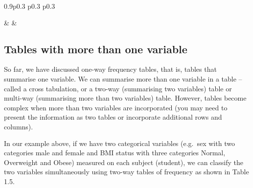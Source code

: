 \documentclass[
]{memoir}
\begin{document}
\begin{table}[ht]
\begin{centerbox}
\begin{threeparttable}
\begin{tabularx}{0.9\textwidth}{p{} p{} p{}}
\hhline{}

 &
 &
 \tabularnewline[-0.5pt]


\end{tabularx}
\end{threeparttable}\par\end{centerbox}

\end{table}
 

\hypertarget{tables-with-more-than-one-variable}{%
\subsection{Tables with more than one variable}\label{tables-with-more-than-one-variable}}

So far, we have discussed one-way frequency tables, that is, tables that summarise one variable. We can summarise more than one variable in a table -- called a cross tabulation, or a two-way (summarising two variables) table or multi-way (summarising more than two variables) table. However, tables become complex when more than two variables are incorporated (you may need to present the information as two tables or incorporate additional rows and columns).

In our example above, if we have two categorical variables (e.g.~sex with two categories male and female and BMI status with three categories Normal, Overweight and Obese) measured on each subject (student), we can classify the two variables simultaneously using two-way tables of frequency as shown in Table 1.5.

 
  \providecommand{\huxb}[2]{\arrayrulecolor[RGB]{#1}\global\arrayrulewidth=#2pt}
  \providecommand{\huxvb}[2]{\color[RGB]{#1}\vrule width #2pt}
  \providecommand{\huxtpad}[1]{\rule{0pt}{#1}}
  \providecommand{\huxbpad}[1]{\rule[-#1]{0pt}{#1}}
\end{document}
